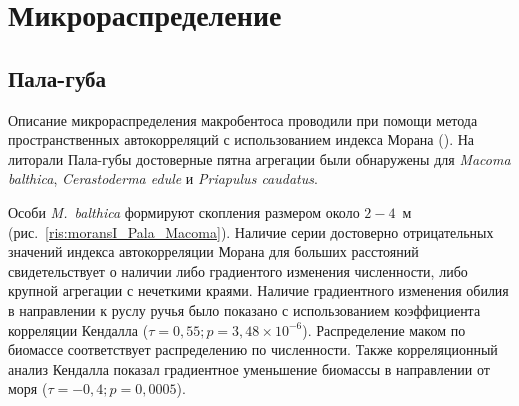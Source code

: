 \section{Микрораспределение}	
	\subsection{Пала-губа}
Описание микрораспределения макробентоса проводили при помощи метода пространственных автокорреляций с использованием индекса Морана (\cite{Thrush_et_al_1989}).
На литорали Пала-губы достоверные пятна агрегации были обнаружены для {\it Macoma balthica}, {\it Cerastoderma edule} и {\it Priapulus caudatus}. 

Особи {\it M.~balthica} формируют скопления размером около $2-4$~м (рис.~\ref{ris:moransI_Pala_Macoma}). 
Наличие серии достоверно отрицательных значений индекса автокорреляции Морана для больших расстояний свидетельствует о наличии либо градиентого изменения численности, либо крупной агрегации с нечеткими краями.
Наличие градиентного изменения обилия в направлении к руслу ручья было показано с использованием коэффициента корреляции Кендалла ($\tau = 0,55; p = 3,48 \times 10^{-6}$).
Распределение маком по биомассе соответствует распределению по численности. Также корреляционный анализ Кендалла показал градиентное уменьшение биомассы в направлении от моря ($\tau = -0,4; p = 0,0005$).


